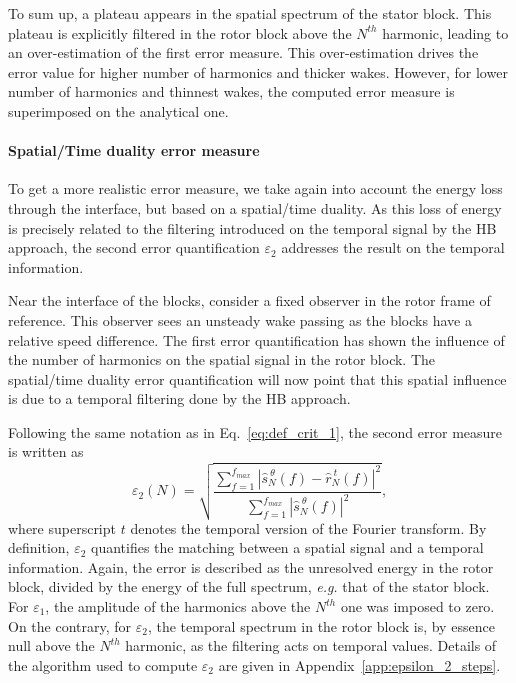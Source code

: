 To sum up, a plateau appears in the spatial spectrum of the
stator block. This plateau is explicitly filtered in the
rotor block above the $N^{th}$ harmonic, leading to an over-estimation of the 
first error measure. This over-estimation drives the error value
for higher number of harmonics and thicker wakes.
However, for lower number of harmonics and thinnest wakes, 
the computed error measure is superimposed on 
the analytical one.

\FloatBarrier

\paragraph{Spatial/Time duality error measure}
To get a more realistic error measure, we take 
again into account the energy loss
through the interface, but based on a spatial/time duality. 
As this loss of energy is 
precisely related to the filtering 
introduced on the temporal signal by the HB approach, the second 
error quantification $\varepsilon_2$ addresses the result on 
the temporal information. 

Near the interface of the blocks, consider a fixed observer in
the rotor frame of reference. This observer sees an unsteady 
wake passing as the blocks have a relative speed difference.
The first error quantification has shown the 
influence of the number of harmonics on the spatial signal 
in the rotor block. The spatial/time 
duality error quantification will now
point that this spatial influence is due to a temporal filtering done by
the HB approach.

Following the same notation as in Eq.~\eqref{eq:def_crit_1}, 
the second error measure is written as
\begin{equation}
    \varepsilon_2(N) = \sqrt{
    \frac{\sum_{f=1}^{f_{max}} | \widehat{s}^{~\theta}_N (f) - 
      \widehat{r}^{~t}_N (f)|^2}{ 
    \sum_{f=1}^{f_{max}} | \widehat{s}^{~\theta}_N (f)|^2}},
    \label{eq:def_crit_2}
\end{equation}
where superscript $t$ denotes the temporal version of
the Fourier transform.
By definition, $\varepsilon_2$
quantifies the matching between a spatial signal
and a temporal information.
Again, the error is described as the unresolved energy 
in the rotor block, 
divided by the energy of the full spectrum, 
\emph{e.g.} that of the stator block. 
For $\varepsilon_1$, the amplitude 
of the harmonics above the $N^{th}$ one was imposed to zero. 
On the contrary, for $\varepsilon_2$, the temporal spectrum 
in the rotor block is, 
by essence null above the $N^{th}$ harmonic, as the filtering 
acts on temporal values. 
Details of the algorithm used to compute $\varepsilon_2$ 
are given in Appendix~\ref{app:epsilon_2_steps}.

